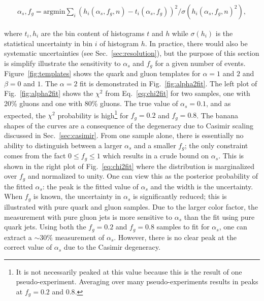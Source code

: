 \begin{align}
\label{eq:chi2fit}
\alpha_s,f_g=\text{argmin} \sum_i (h_i(\alpha_s,f_g,n)-t_i(\alpha_s,f_g))^2/\sigma(h_i(\alpha_s,f_g,n)^2),
\end{align}

\noindent where $t_i, h_i$ are the bin content of histograms $t$ and $h$ while $\sigma(h_i)$ is the statistical uncertainty in bin $i$ of histogram $h$.  In practice, there would also be systematic uncertainties (see Sec.~\ref{sec:resolution}), but the purpose of this section is simplify illustrate the sensitivity to $\alpha_s$ and $f_g$ for a given number of events.  Figure~\ref{fig:templates} shows the quark and gluon templates for $\alpha=1$ and $2$ and $\beta=0$ and $1$.  The $\alpha=2$ fit is demonstrated in Fig.~\ref{fig:alpha2fit}.  The left plot of Fig.~\ref{fig:alpha2fit} shows the $\chi^2$ from Eq.~\ref{eq:chi2fit} for two samples, one with 20\% gluons and one with 80\% gluons.  The true value of $\alpha_s=0.1$, and as expected, the $\chi^2$ probability is high\footnote{It is not necessarily peaked at this value because this is the result of one pseudo-experiment.  Averaging over many pseudo-experiments results in peaks at $f_g=0.2$ and $0.8$.} for $f_g=0.2$ and $f_g=0.8$.  The banana shapes of the curves are a consequence of the degeneracy due to Casimir scaling discussed in Sec.~\ref{sec:casimir}.  From one sample alone, there is essentially no ability to distinguish between a larger $\alpha_s$ and a smaller $f_g$; the only constraint comes from the fact $0\leq f_g\leq 1$ which results in a crude bound on $\alpha_s$.  This is shown in the right plot of Fig.~\ref{eq:chi2fit} where the distribution is marginalized over $f_g$ and normalized to unity.  One can view this as the posterior probability of the fitted $\alpha_s$: the peak is the fitted value of $\alpha_s$ and the width is the uncertainty.  When $f_g$ is known, the uncertainty in $\alpha_s$ is significantly reduced; this is illustrated with pure quark and gluon samples.  Due to the larger color factor, the measurement with pure gluon jets is more sensitive to $\alpha_s$ than the fit using pure quark jets.  Using both the $f_g=0.2$ and $f_g=0.8$ samples to fit for $\alpha_s$, one can extract a $\sim 30\%$ measurement of $\alpha_s$.  However, there is no clear peak at the correct value of $\alpha_s$ due to the Casimir degeneracy.  

